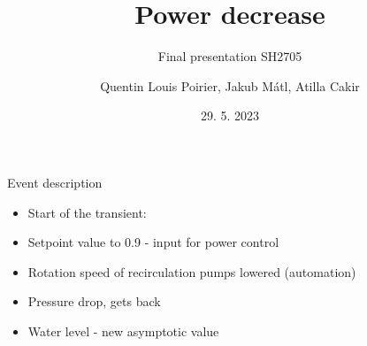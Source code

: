 

\title[APROS simulations of BWR transients]{Power decrease}
\subtitle{Final presentation SH2705}
\author{Quentin Louis Poirier, Jakub Mátl, Atilla Cakir}
\date[24/05/23]{29. 5. 2023}
\usepackage{comment}

\usepackage[style=authoryear-ibid,backend=biber]{biblatex}
\usepackage{pgfplots}
\pgfplotsset{compat=1.18}



\nologo %



	
	\frame{\titlepage}
	
	
	\begin{frame}{Event description}
			\begin{itemize}
				\small
				\item Start of the transient:
				\item Setpoint value to 0.9 - input for power control
				\item Rotation speed of recirculation pumps lowered (automation)
				\item Pressure drop, gets back
				\item Water level - new asymptotic value
				
				
			\end{itemize}
	\end{frame}



